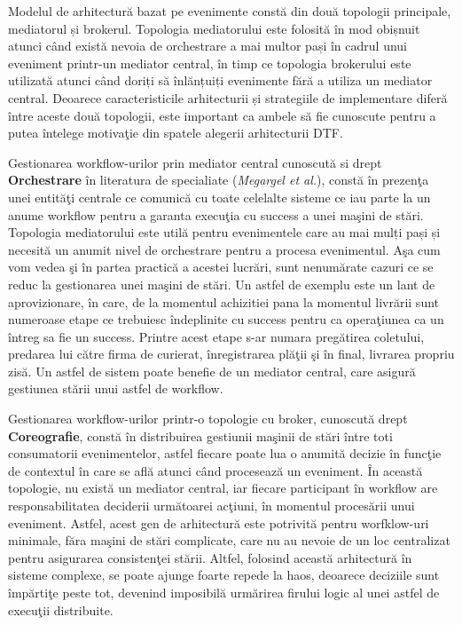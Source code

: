 \documentclass[a4paper,12pt]{report}
\begin{document}
Modelul de arhitectură bazat pe evenimente constă din două topologii principale, mediatorul și brokerul. Topologia mediatorului este folosită în mod obișnuit atunci când există nevoia de orchestrare a mai multor pași în cadrul unui eveniment printr-un mediator central, în timp ce topologia brokerului este utilizată atunci când doriți să înlănțuiți evenimente fără a utiliza un mediator central. Deoarece caracteristicile arhitecturii și strategiile de implementare diferă între aceste două topologii, este important ca ambele să fie cunoscute pentru a putea întelege motivaţie din spatele alegerii arhitecturii DTF. 

\par Gestionarea workflow-urilor prin mediator central cunoscută si drept \textbf{Orchestrare} în literatura de specialiate (\emph{Megargel et al.}\cite{megargel2021}), constă în prezenţa unei entităţi centrale ce comunică cu toate celelalte sisteme ce iau parte la un anume workflow pentru a garanta execuţia cu success a unei maşini de stări. Topologia mediatorului este utilă pentru evenimentele care au mai mulți pași și necesită un anumit nivel de orchestrare pentru a procesa evenimentul. Aşa cum vom vedea şi în partea practică a acestei lucrări, sunt nenumărate cazuri ce se reduc la gestionarea unei maşini de stări. Un astfel de exemplu este un lant de aprovizionare, în care, de la momentul achizitiei pana la momentul livrării sunt numeroase etape ce trebuiesc îndeplinite cu success pentru ca operaţiunea ca un întreg sa fie un success. Printre acest etape s-ar numara pregătirea coletului, predarea lui către firma de curierat, înregistrarea plăţii şi în final, livrarea propriu zisă. Un astfel de sistem poate benefie de un mediator central, care asigură gestiunea stării unui astfel de workflow. 
\par Gestionarea workflow-urilor printr-o topologie cu broker, cunoscută drept  \textbf{Coreografie}, constă în distribuirea gestiunii maşinii de stări între toti consumatorii evenimentelor, astfel fiecare poate lua o anumită decizie în funcţie de contextul în care se află atunci când procesează un eveniment. În această topologie, nu există un mediator central, iar fiecare participant în workflow are responsabilitatea deciderii următoarei acţiuni, în momentul procesării unui eveniment. Astfel, acest gen de arhitectură este potrivită pentru worfklow-uri minimale, făra maşini de stări complicate, care nu au nevoie de un loc centralizat pentru asigurarea consistenţei stării. Altfel, folosind această arhitectură în sisteme complexe, se poate ajunge foarte repede la haos, deoarece deciziile sunt împărtiţe peste tot, devenind imposibilă urmărirea firului logic al unei astfel de execuţii distribuite. 
\end{document}
